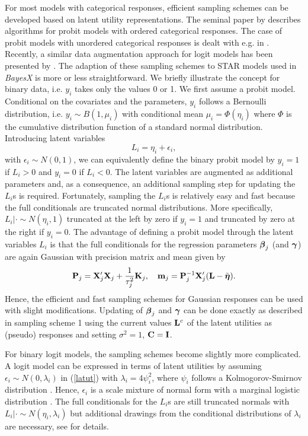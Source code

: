 \documentclass[11pt,a4paper,twoside]{bayesxarticle}
\begin{document}
For most models with categorical responses, efficient sampling schemes can be developed based on latent utility
representations. The seminal paper by  describes algorithms for probit models with ordered categorical
responses. The case of probit models with unordered categorical responses is dealt with e.g. in .
Recently, a similar data augmentation approach for logit models has been presented by . The adaption of
these sampling schemes to STAR models used in {\em BayesX} is more or less straightforward. We briefly illustrate the concept
for binary data, i.e. $y_i$ takes only the values 0 or 1. We first assume a probit model. Conditional on the covariates and the
parameters, $y_i$ follows a Bernoulli distribution, i.e. $y_i \sim B(1,\mu_i)$ with conditional mean $\mu_i = \Phi(\eta_i)$
where $\Phi$ is the cumulative distribution function of a standard normal distribution. Introducing latent variables
\begin{equation}
\label{latut} L_i = \eta_i + \epsilon_i,
\end{equation}
with $\epsilon_i \sim N(0,1)$, we can equivalently define the binary
probit model by $y_i = 1$ if $L_i > 0$ and $y_i=0$ if $L_i < 0$. The
latent variables are augmented as additional parameters and, as a
consequence, an additional sampling step for updating the $L_i$s is
required. Fortunately, sampling the $L_i$s is relatively easy and
fast because the full conditionals are truncated normal
distributions. More specifically, $L_i | \cdot \sim N(\eta_i,1)$
truncated at the left by zero if $y_i=1$ and truncated by zero at
the right if $y_i=0$. The advantage of defining a probit model
through the latent variables $L_i$ is that the full conditionals for
the regression parameters $\boldsymbol{\beta}_j$ (and $\boldsymbol{\gamma}$) are again
Gaussian with precision matrix and mean given by
\begin{equation}
\label{prec2} \Pvec_j = \Xvec_j'\Xvec_j + \frac{1}{\tau^2_j}\Kvec_j, \quad \mvec_j =
\Pvec_j^{-1} \Xvec_j'(\Lvec-\tilde{\etavec}).
\end{equation}
Hence, the efficient and fast sampling schemes for Gaussian
responses can be used with slight modifications. Updating of
$\boldsymbol{\beta}_j$ and $\boldsymbol{\gamma}$ can be done exactly as described in
sampling scheme 1  using the current values $\mathbf{L}^c$ of the latent
utilities as (pseudo) responses and setting $\sigma^2=1$, $\mathbf{C}=\mathbf{I}$.

For binary logit models, the sampling schemes become slightly more complicated. A logit model can be expressed in terms of
latent utilities by assuming $\epsilon_i \sim N(0,\lambda_i)$ in (\ref{latut}) with $\lambda_i = 4\psi_i^2$, where $\psi_i$
follows a Kolmogorov-Smirnov distribution \cite{Dev86}. Hence, $\epsilon_i$ is  a scale mixture of normal form with a marginal
logistic distribution \cite{AndMal74}. The full conditionals for the $L_i$s are still truncated normals with $L_i | \cdot \sim
N(\eta_i,\lambda_i)$ but additional drawings from the conditional distributions of $\lambda_i$ are necessary, see
 for details.
\end{document}
